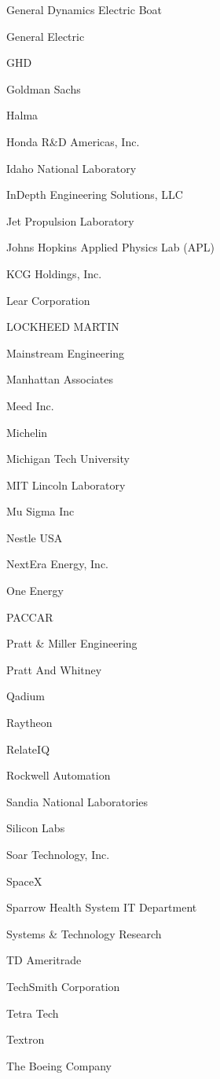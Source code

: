 \documentclass[twoside]{article}
\begin{document}
\begin{center}
\begin{multicols}{5}
\begin{FlushLeft}
\begin{compactitem}
\item General Dynamics Electric Boat
\item General Electric
\item GHD
\item Goldman Sachs
\item Halma
\item Honda R\&D Americas, Inc.
\item Idaho National Laboratory
\item InDepth Engineering Solutions, LLC
\item Jet Propulsion Laboratory
\item Johns Hopkins Applied Physics Lab (APL)
\item KCG Holdings, Inc.
\item Lear Corporation
\item LOCKHEED MARTIN
\item Mainstream Engineering
\item Manhattan Associates
\item Meed Inc.
\item Michelin
\item Michigan Tech University
\item MIT Lincoln Laboratory
\item Mu Sigma Inc
\item Nestle USA
\item NextEra Energy, Inc.
\item One Energy
\item PACCAR
\item Pratt \& Miller Engineering
\item Pratt And Whitney
\item Qadium
\item Raytheon
\item RelateIQ
\item Rockwell Automation
\item Sandia National Laboratories
\item Silicon Labs
\item Soar Technology, Inc.
\item SpaceX
\item Sparrow Health System IT Department
\item Systems \& Technology Research
\item TD Ameritrade
\item TechSmith Corporation
\item Tetra Tech
\item Textron
\item The Boeing Company

\end{compactitem}
\end{FlushLeft}
\end{multicols}
\end{center}
\end{document}
